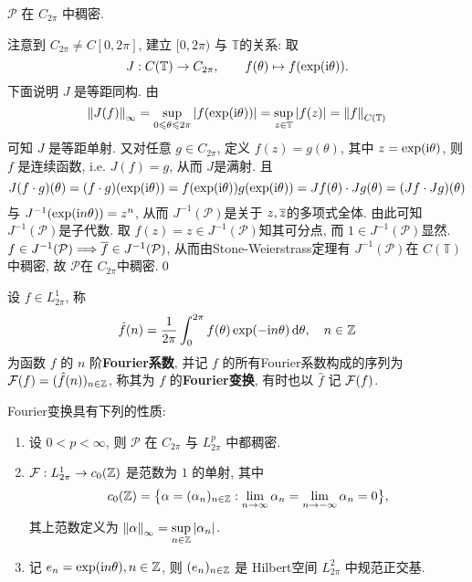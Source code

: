 	\begin{Lemma}
		$ \mathcal P $ 在 $ C_{2\pi} $ 中稠密.
	\end{Lemma}
	\begin{Proof}
		注意到 $ C_{2\pi}\ne C[0,2\pi] $, 建立 $ [0,2\pi) $ 与 $ \mathbb T $的关系: 取
		\[
			J : C(\mathbb T) \to C_{2\pi},\qquad f(\theta)\mapsto f(\exp(\imag\theta)).
		\]
		下面说明 $ J $ 是等距同构. 由
		\[
			\norm{J(f)}_\infty=\sup_{0\leqslant\theta\leqslant 2\pi}\abs{f(\exp(\imag\theta))}=\sup_{z\in\mathbb T}\abs{f(z)}=\norm{f}_{C(\mathbb T)}
		\]
		可知 $ J $ 是等距单射. 又对任意 $ g\in C_{2\pi} $, 定义 $ f(z)=g(\theta) $, 其中 $ z=\exp(\imag\theta) $, 则 $ f $ 是连续函数, i.e. $ J(f)=g $, 从而 $ J $是满射. 且
		\[
			J(f\cdot g)(\theta)=(f\cdot g)(\exp(\imag\theta))=f(\exp(\imag\theta))g(\exp(\imag\theta))=Jf(\theta)\cdot Jg(\theta)=(Jf\cdot Jg)(\theta)
		\]
		与 $ J^{-1}(\exp(\imag n\theta))=z^n $, 从而 $ J^{-1}(\mathcal P) $是关于 $ z,\baro{z} $的多项式全体. 由此可知 $ J^{-1}(\mathcal P) $是子代数. 取 $ f(z)=z\in J^{-1}(\mathcal P) $知其可分点, 而 $ 1\in J^{-1}(\mathcal P) $显然. $ f\in J^{-1}(\mathcal P)\Longrightarrow \baro{f}\in J^{-1}(\mathcal P) $, 从而由Stone-Weierstrass定理有 $ J^{-1}(\mathcal P) $在 $ C(\mathbb T) $中稠密, 故 $ \mathcal P $在 $ C_{2\pi} $中稠密.\qed
	\end{Proof}

	\begin{Definition}\label{def:Fourier系数, Fourier变换}
		设 $ f\in L_{2\pi}^{1} $, 称
		\[
			\hat{f}(n)=\frac{1}{2\pi}\int_{0}^{2\pi}f(\theta)\exp(-\imag n\theta)\diff\theta,\quad n\in\Z
		\]
		为函数  $ f $ 的 $ n $ 阶\textbf{Fourier系数}, 并记 $ f $ 的所有Fourier系数构成的序列为 $ \CF(f)=(\hat{f}(n))_{n\in\Z} $, 称其为 $ f $ 的\textbf{Fourier变换}, 有时也以 $ \hat{f} $ 记 $ \CF(f) $. 
	\end{Definition}
	\begin{Theorem}
		Fourier变换具有下列的性质:
		\begin{enumerate}[(1)]
			\item 设 $ 0<p<\infty $, 则 $ \mathcal{P} $ 在 $ C_{2\pi} $ 与 $ L_{2\pi}^{p} $ 中都稠密.
			\item $ \CF : L_{2\pi}^{1}\to c_{0}(\Z) $ 是范数为 $ 1 $ 的单射, 其中
			\[
				c_{0}(\Z)=\big\{ \alpha = (\alpha_{n})_{n\in\Z}: \lim\limits_{n\to\infty}\alpha_{n}=\lim\limits_{n\to-\infty}\alpha_{n}=0 \big\},
			\]
			其上范数定义为 $ \norm{\alpha}_{\infty}=\sup\limits_{n\in\Z}\abs{\alpha_{n}} $.
			\item 记 $ e_{n}=\exp(\imag n\theta), n\in\Z $, 则 $ (e_{n})_{n\in\Z} $ 是 Hilbert空间 $ L_{2\pi}^{2} $ 中规范正交基.
		\end{enumerate}
	\end{Theorem}

